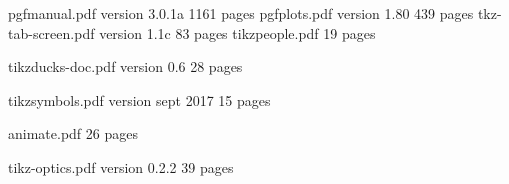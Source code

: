 %
\label{sources}
%

\newpage

\begin{thebibliography}{99}
 pgfmanual.pdf  	\hspace{1cm}	version 3.0.1a \hspace{1cm} 	1161 pages 	\hspace{1cm}	\DGB
{} pgfplots.pdf 	\hspace{1cm}	version 1.80 \hspace{1cm} 	439 pages 	\hspace{1cm}	\DGB
{} tkz-tab-screen.pdf 	\hspace{1cm}	version 1.1c \hspace{1cm} 	83 pages 	\hspace{1cm}	\DFR
{} tikzpeople.pdf 	\hspace{1cm}	 \hspace{1cm} 	19 pages 	\hspace{1cm}	\DGB

 tikzducks-doc.pdf 	\hspace{1cm}	version 0.6  \hspace{1cm} 	28 pages 	\hspace{1cm}	\DGB

 tikzsymbols.pdf 	\hspace{1cm}	version sept 2017  \hspace{1cm} 	15 pages 	\hspace{1cm}	\DGB

 animate.pdf 	\hspace{1cm}	 \hspace{1cm} 	26 pages 	\hspace{1cm}	\DGB

 tikz-optics.pdf	\hspace{1cm}	version 0.2.2  \hspace{1cm} 	39 pages 	\hspace{1cm}	\DFR
\end{thebibliography}

